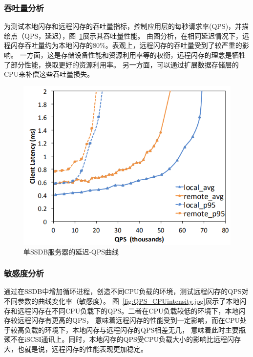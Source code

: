 \subsubsection{吞吐量分析}
为测试本地闪存和远程闪存的吞吐量指标，控制应用层的每秒请求率(QPS)，并描绘点（QPS，延迟），图~\ref{fig:QPS_latency}展示其吞吐量性能。
由图分析，在相同延迟情况下，远程闪存吞吐量约为本地闪存的80\%。表观上，远程闪存的吞吐量受到了较严重的影响。
一方面，这是存储设备性能和资源利用率等的权衡，远程闪存的理念是牺牲了部分性能，换取更好的资源利用率。
另一方面，可以通过扩展数据存储层的CPU来补偿这些吞吐量损失。

\begin{figure}
\centering
\includegraphics[scale=0.8]{Figures/storage/QPS_latency.jpg}
\decoRule
\caption{单SSDB服务器的延迟-QPS曲线}
\label{fig:QPS_latency}
\end{figure}

\subsubsection{敏感度分析}
通过在SSDB中增加循环进程，创造不同CPU负载的环境，测试远程闪存的QPS对不同参数的曲线变化率（敏感度）。
图~\ref{fig:QPS_CPUintensity.jpg}展示了本地闪存和远程闪存在不同CPU负载下的QPS。二者在CPU负载较低的环境下，本地闪存较远程闪存有更高的QPS，
意味着远程闪存的性能受到一定影响，而在CPU处于较高负载的环境下，本地闪存与远程闪存的QPS相差无几，
意味着此时主要瓶颈不在iSCSI通讯上。同时，本地闪存的QPS受CPU负载大小的影响比远程闪存大，也就是说，远程闪存的性能表现更加稳定。


